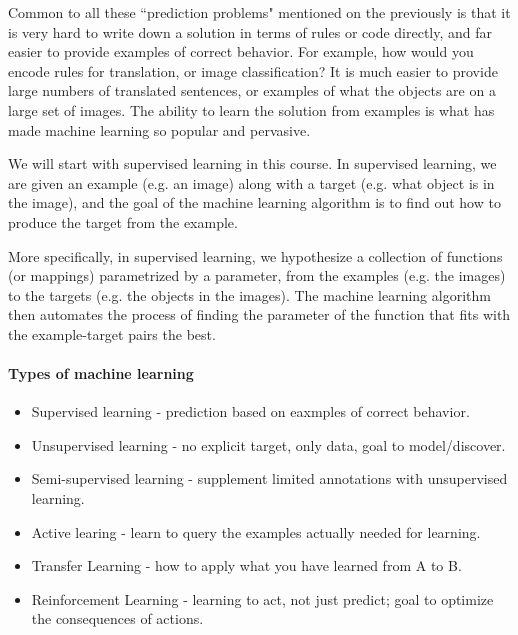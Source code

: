 \documentclass{scrartcl}
\begin{document}
\begin{remark}
Common to all these “prediction problems" mentioned on the previously is that it is very hard to write down a solution in terms of rules or code directly, and far easier to provide examples of correct behavior. For example, how would you encode rules for translation, or image classification? It is much easier to provide large numbers of translated sentences, or examples of what the objects are on a large set of images. The ability to learn the solution from examples is what has made machine learning so popular and pervasive.

We will start with supervised learning in this course. In supervised learning, we are given an example (e.g. an image) along with a target (e.g. what object is in the image), and the goal of the machine learning algorithm is to find out how to produce the target from the example.

More specifically, in supervised learning, we hypothesize a collection of functions (or mappings) parametrized by a parameter, from the examples (e.g. the images) to the targets (e.g. the objects in the images). The machine learning algorithm then automates the process of finding the parameter of the function that fits with the example-target pairs the best.

\end{remark}

\paragraph{Types of machine learning}
\begin{itemize}
\item Supervised learning - prediction based on eaxmples of 
correct behavior.
\item Unsupervised learning - no explicit target, only data, goal to model/discover.
\item Semi-supervised learning - supplement limited annotations with unsupervised learning.
\item Active learing - learn to query the examples actually needed for learning.
\item Transfer Learning - how to apply what you have learned from A to B.
\item Reinforcement Learning - learning to act, not just predict; goal to optimize the consequences of actions.
\end{itemize}
\end{document}
